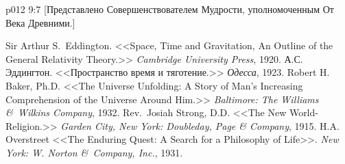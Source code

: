 \vsetoff
\vs p012 9:7 [Представлено Совершенствователем Мудрости, уполномоченным От Века Древними.]
\quizlink
\begin{thebibliography}{100}
Sir Arthur S.~Eddington.
{<<Space, Time and Gravitation, An Outline of the General Relativity Theory.>>}
{\em Cambridge University Press}, 1920.
А.С.\,Эддингтон.
{<<Пространство время и тяготение.>>}
{\em Одесса}, 1923.
Robert H. Baker, Ph.D.
{<<The Universe Unfolding: A Story of Man's Increasing Comprehension of the Universe Around Him.>>}
{\em Baltimore: The Williams \&\ Wilkins Company}, 1932.
Rev.~Josiah Strong, D.D.
{<<The New World\hyp{}Religion.>>}
{\em Garden City, New York: Doubleday, Page \& Company}, 1915.
H.A. Overstreet
{<<The Enduring Quest: A Search for a Philosophy of Life>>.}
{\em New York: W. Norton \&\ Company, Inc.}, 1931.
\end{thebibliography}
